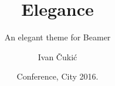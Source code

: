 
\title{Elegance}
\subtitle{An elegant theme for Beamer}
\author{Ivan Čukić}

\date{\footnotesize\color{mainthemecolour} Conference, City 2016. }

